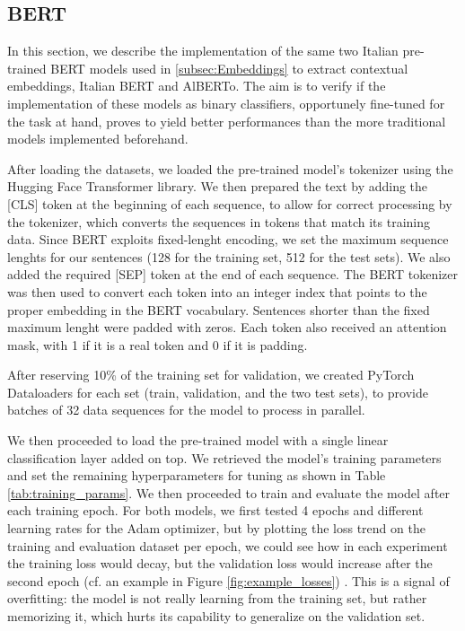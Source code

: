\subsection{BERT}
\label{subsec:BERT_methods}
In this section, we describe the implementation of the same two Italian pre-trained BERT models used in \ref{subsec:Embeddings} to extract contextual embeddings, Italian BERT and AlBERTo. The aim is to verify if the implementation of these models as binary classifiers, opportunely fine-tuned for the task at hand, proves to yield better performances than the more traditional models implemented beforehand.

After loading the datasets, we loaded the pre-trained model's tokenizer using the Hugging Face Transformer library. We then prepared the text by adding the [CLS] token at the beginning of each sequence, to allow for correct processing by the tokenizer, which converts the sequences in tokens that match its training data. Since BERT exploits fixed-lenght encoding, we set the maximum sequence lenghts for our sentences (128 for the training set, 512 for the test sets). We also added the required [SEP] token at the end of each sequence. The BERT tokenizer was then used to convert each token into an integer index that points to the proper embedding in the BERT vocabulary. Sentences shorter than the fixed maximum lenght were padded with zeros. Each token also received an attention mask, with 1 if it is a real token and 0 if it is padding.

After reserving 10\% of the training set for validation, we created PyTorch Dataloaders for each set (train, validation, and the two test sets), to provide batches of 32 data sequences for the model to process in parallel.

We then proceeded to load the pre-trained model with a single linear classification layer added on top. We retrieved the model's training parameters and set the remaining hyperparameters for tuning as shown in Table \ref{tab:training_params}. We then proceeded to train and evaluate the model after each training epoch. For both models, we first tested 4 epochs and different learning rates for the Adam optimizer, but by plotting the loss trend on the training and evaluation dataset per epoch, we could see how in each experiment the training loss would decay, but the validation loss would increase after the second epoch (cf. an example in Figure \ref{fig:example_losses}) . This is a signal of overfitting: the model is not really learning from the training set, but rather memorizing it, which hurts its capability to generalize on the validation set.


